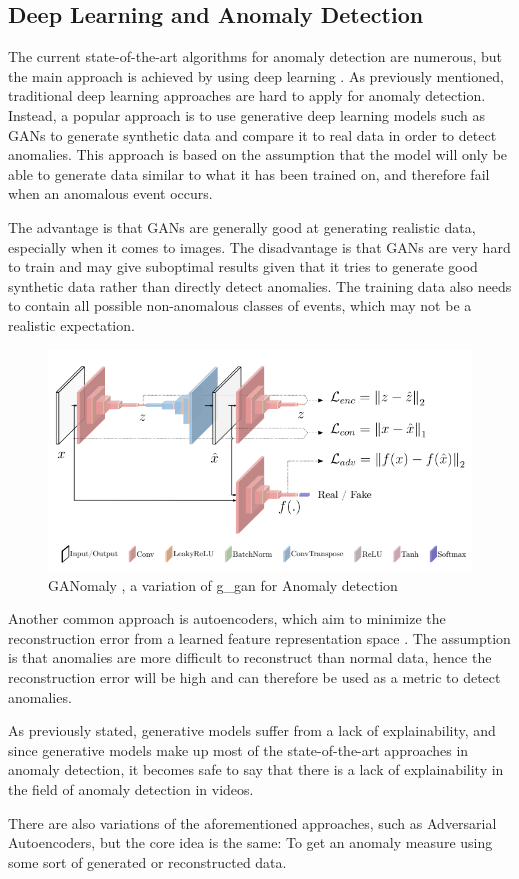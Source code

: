 \subsection{Deep Learning and Anomaly Detection}
\label{sec:dl_anom_detection}
The current state-of-the-art algorithms for anomaly detection are numerous, but the main approach is achieved by using deep learning \cite{anomaly_detection}. As previously mentioned, traditional deep learning approaches are hard to apply for anomaly detection. Instead, a popular approach is to use generative deep learning models such as GANs \cite{anomaly_detection, ganomaly,anomalyvideo} to generate synthetic data and compare it to real data in order to detect anomalies. This approach is based on the assumption that the model will only be able to generate data similar to what it has been trained on, and therefore fail when an anomalous event occurs.
\par The advantage is that GANs are generally good at generating realistic data, especially when it comes to images. The disadvantage is that GANs are very hard to train and may give suboptimal results given that it tries to generate good synthetic data rather than directly detect anomalies. The training data also needs to contain all possible non-anomalous classes of events, which may not be a realistic expectation.
\par
\begin{figure}[H]
    \centering
    \includegraphics[width=\linewidth]{resources/models/ganomaly.png}
    \caption{GANomaly \cite{ganomaly}, a variation of \gls*{g_gan} for Anomaly detection}
    \label{fig:ganomaly}
\end{figure}
Another common approach is autoencoders, which aim to minimize the reconstruction error from a learned feature representation space \cite{autoencoder1,anomaly_detection,anomalyvideo}. The assumption is that anomalies are more difficult to reconstruct than normal data, hence the reconstruction error will be high and can therefore be used as a metric to detect anomalies.
\par
As previously stated, generative models suffer from a lack of explainability, and since generative models make up most of the state-of-the-art approaches in anomaly detection, it becomes safe to say that there is a lack of explainability in the field of anomaly detection in videos.
\par
There are also variations of the aforementioned approaches, such as Adversarial Autoencoders, but the core idea is the same: To get an anomaly measure using some sort of generated or reconstructed data.
